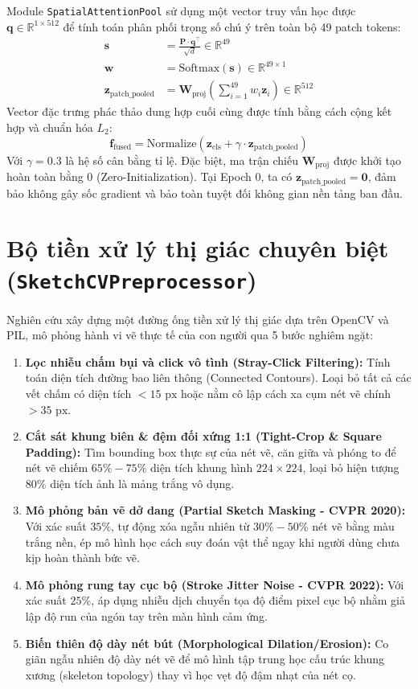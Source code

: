 \documentclass[12pt,a4paper]{report}
\begin{document}
Module \texttt{SpatialAttentionPool} sử dụng một vector truy vấn học được $\mathbf{q} \in \mathbb{R}^{1 \times 512}$ để tính toán phân phối trọng số chú ý trên toàn bộ 49 patch tokens:
\begin{align}
    \mathbf{s} &= \frac{\mathbf{P} \cdot \mathbf{q}^\top}{\sqrt{d}} \in \mathbb{R}^{49} \\
    \mathbf{w} &= \text{Softmax}(\mathbf{s}) \in \mathbb{R}^{49 \times 1} \\
    \mathbf{z}_{\text{patch\_pooled}} &= \mathbf{W}_{\text{proj}} \left( \sum_{i=1}^{49} w_i \mathbf{z}_i \right) \in \mathbb{R}^{512}
\end{align}
Vector đặc trưng phác thảo dung hợp cuối cùng được tính bằng cách cộng kết hợp và chuẩn hóa $L_2$:
\begin{equation}
    \mathbf{f}_{\text{fused}} = \text{Normalize}\left( \mathbf{z}_{\text{cls}} + \gamma \cdot \mathbf{z}_{\text{patch\_pooled}} \right)
\end{equation}
Với $\gamma = 0.3$ là hệ số cân bằng tỉ lệ. Đặc biệt, ma trận chiếu $\mathbf{W}_{\text{proj}}$ được khởi tạo hoàn toàn bằng $0$ (Zero-Initialization). Tại Epoch 0, ta có $\mathbf{z}_{\text{patch\_pooled}} = \mathbf{0}$, đảm bảo không gây sốc gradient và bảo toàn tuyệt đối không gian nền tảng ban đầu.

\section{Bộ tiền xử lý thị giác chuyên biệt (\texttt{SketchCVPreprocessor})}
Nghiên cứu xây dựng một đường ống tiền xử lý thị giác dựa trên OpenCV và PIL, mô phỏng hành vi vẽ thực tế của con người qua 5 bước nghiêm ngặt:
\begin{enumerate}
    \item \textbf{Lọc nhiễu chấm bụi và click vô tình (Stray-Click Filtering):} Tính toán diện tích đường bao liên thông (Connected Contours). Loại bỏ tất cả các vết chấm có diện tích $< 15\text{ px}$ hoặc nằm cô lập cách xa cụm nét vẽ chính $> 35\text{ px}$.
    \item \textbf{Cắt sát khung biên \& đệm đối xứng 1:1 (Tight-Crop \& Square Padding):} Tìm bounding box thực sự của nét vẽ, căn giữa và phóng to để nét vẽ chiếm $65\% - 75\%$ diện tích khung hình $224 \times 224$, loại bỏ hiện tượng $80\%$ diện tích ảnh là mảng trắng vô dụng.
    \item \textbf{Mô phỏng bản vẽ dở dang (Partial Sketch Masking - CVPR 2020):} Với xác suất $35\%$, tự động xóa ngẫu nhiên từ $30\% - 50\%$ nét vẽ bằng màu trắng nền, ép mô hình học cách suy đoán vật thể ngay khi người dùng chưa kịp hoàn thành bức vẽ.
    \item \textbf{Mô phỏng rung tay cục bộ (Stroke Jitter Noise - CVPR 2022):} Với xác suất $25\%$, áp dụng nhiễu dịch chuyển tọa độ điểm pixel cục bộ nhằm giả lập độ run của ngón tay trên màn hình cảm ứng.
    \item \textbf{Biến thiên độ dày nét bút (Morphological Dilation/Erosion):} Co giãn ngẫu nhiên độ dày nét vẽ để mô hình tập trung học cấu trúc khung xương (skeleton topology) thay vì học vẹt độ đậm nhạt của nét cọ.
\end{enumerate}
\end{document}
